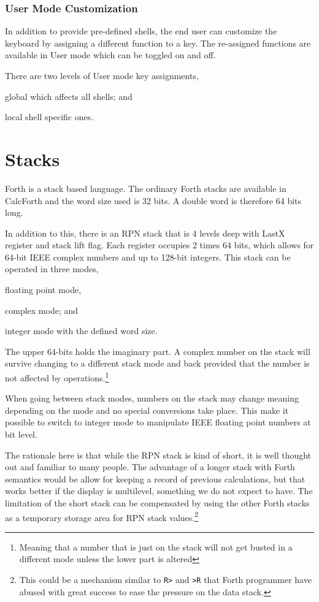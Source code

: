 \documentclass[a4paper]{article}
\begin{document}
\subsubsection{User Mode Customization}
In addition to provide pre-defined shells, the end user can customize the keyboard by assigning a different function to a key. The re-assigned functions are available in User mode which can be toggled on and off.

There are two levels of User mode key assignments,
\begin{inparaenum}
\item global which affects all shells;  and
\item local shell specific ones.
\end{inparaenum}


\section{Stacks}
Forth is a stack based language. The ordinary Forth stacks are available in CalcForth and the word size used is 32 bits. A double word is therefore 64 bits long.

In addition to this, there is an RPN stack that is 4 levels deep with LastX register and stack lift flag.
Each register occupies 2 times 64 bits, which allows for 64-bit IEEE complex numbers and up to 128-bit integers.
This stack can be operated in three modes,
\begin{inparaenum}
\item  floating point mode,
\item complex mode; and
\item integer mode with the defined word size.
\end{inparaenum}

The upper 64-bits holds the imaginary part. A complex number on the stack will survive changing to a different stack mode and back provided that the number is not affected by operations.\footnote{Meaning that a number that is just on the stack will not get busted in a different mode unless the lower part is altered}

When going between stack modes, numbers on the stack may change meaning depending on the mode and no special conversions take place. This make it possible to switch to integer mode to manipulate IEEE floating point numbers at bit level.

The rationale here is that while the RPN stack is kind of short, it is well thought out and familiar to many people. The advantage of a longer stack with Forth semantics would be allow for keeping a record of previous calculations, but that works better if the display is multilevel, something we do not expect to have. The limitation of the short stack can be compensated by using the other Forth stacks as a temporary storage area for RPN stack values.\footnote{This could be a mechanism similar to {\tt R>} and {\tt >R} that Forth programmer have abused with great success to ease the pressure on the data stack.}
\end{document}

